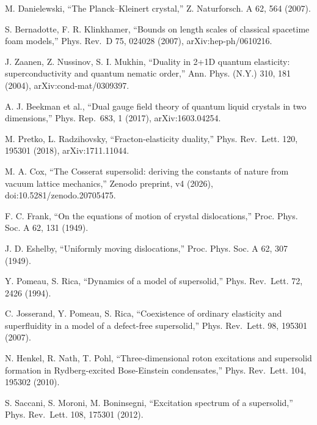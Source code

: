 \documentclass[
  11pt,
]{article}
\begin{document}
\begin{list}{}{\setlength{\leftmargin}{2.5em}\setlength{\labelwidth}{2.2em}\setlength{\labelsep}{0.3em}\setlength{\itemsep}{1pt}\setlength{\parsep}{0pt}\setlength{\topsep}{2pt}}
\item[{[23]}] M. Danielewski, ``The Planck--Kleinert crystal,'' Z.
Naturforsch. A 62, 564 (2007).

\item[{[24]}] S. Bernadotte, F. R. Klinkhamer, ``Bounds on length scales
of classical spacetime foam models,'' Phys. Rev.~D 75, 024028 (2007),
arXiv:hep-ph/0610216.

\item[{[25]}] J. Zaanen, Z. Nussinov, S. I. Mukhin, ``Duality in 2+1D
quantum elasticity: superconductivity and quantum nematic order,'' Ann.
Phys. (N.Y.) 310, 181 (2004), arXiv:cond-mat/0309397.

\item[{[26]}] A. J. Beekman et al., ``Dual gauge field theory of quantum
liquid crystals in two dimensions,'' Phys. Rep.~683, 1 (2017),
arXiv:1603.04254.

\item[{[27]}] M. Pretko, L. Radzihovsky, ``Fracton-elasticity duality,''
Phys. Rev.~Lett. 120, 195301 (2018), arXiv:1711.11044.

\item[{[28]}] M. A. Cox, ``The Cosserat supersolid: deriving the
constants of nature from vacuum lattice mechanics,'' Zenodo preprint, v4
(2026), doi:10.5281/zenodo.20705475.

\item[{[29]}] F. C. Frank, ``On the equations of motion of crystal
dislocations,'' Proc. Phys. Soc. A 62, 131 (1949).

\item[{[30]}] J. D. Eshelby, ``Uniformly moving dislocations,'' Proc.
Phys. Soc. A 62, 307 (1949).

\item[{[31]}] Y. Pomeau, S. Rica, ``Dynamics of a model of supersolid,''
Phys. Rev.~Lett. 72, 2426 (1994).

\item[{[32]}] C. Josserand, Y. Pomeau, S. Rica, ``Coexistence of
ordinary elasticity and superfluidity in a model of a defect-free
supersolid,'' Phys. Rev.~Lett. 98, 195301 (2007).

\item[{[33]}] N. Henkel, R. Nath, T. Pohl, ``Three-dimensional roton
excitations and supersolid formation in Rydberg-excited Bose-Einstein
condensates,'' Phys. Rev.~Lett. 104, 195302 (2010).

\item[{[34]}] S. Saccani, S. Moroni, M. Boninsegni, ``Excitation
spectrum of a supersolid,'' Phys. Rev.~Lett. 108, 175301 (2012).


\end{list}
\end{document}
